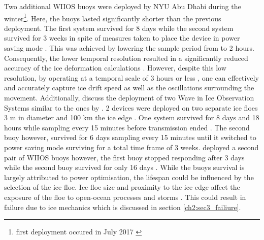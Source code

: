 Two additional WIIOS buoys were deployed by NYU Abu Dhabi \textcite{vichi2019effects,alberello2019drift} during the winter\footnote{first deployment occured in July 2017 \cite{vichi2019effects,alberello2019drift}}. Here, the buoys lasted significantly shorter than the previous deployment. The first system survived for 8 days while the second system survived for 3 weeks in spite of measures taken to place the device in power saving mode \cite{vichi2019effects,alberello2019drift}. This was achieved by lowering the sample period from to 2 hours. Consequently, the lower temporal resolution resulted in a significantly reduced accuracy of the ice deformation calculations \cite{vichi2019effects,alberello2019drift}. However, despite this low resolution, by operating at a temporal scale of 3 hours or less \cite{vichi2019effects,alberello2019drift}, one can effectively and accurately capture ice drift speed as well as the oscillations surrounding the movement. Additionally, \textcite{vichi2019effects,albarello2020drift} discuss the deployment of two Wave in Ice Observation Systems similar to the ones by \cite{kohout2015device}. 2 devices were deployed on two separate ice floes 3 m in diameter and 100 km  the ice edge \cite{vichi2019effects,albarello2020drift}. One system survived for 8 days and 18 hours while sampling every 15 minutes before transmission ended \cite{vichi2019effects,albarello2020drift}. The second buoy however, survived for 6 days sampling every 15 minutes until it switched to power saving mode surviving for a total time frame of 3 weeks. \textcite{vichi2019effects,alberello2019drift} deployed a second pair of WIIOS buoys however, the first buoy stopped responding after 3 days while the second buoy survived for only 16 days \cite{vichi2019effects}. While the buoys survival is largely attributed to power optimisation, the lifespan could be influenced by the selection of the ice floe. Ice floe size and proximity to the ice edge affect the exposure of the floe to open-ocean processes and storms \cite{vichi2019effects}. This could result in failure due to ice mechanics which is discussed in section \ref{ch2:sec3_failiure}. \par 

